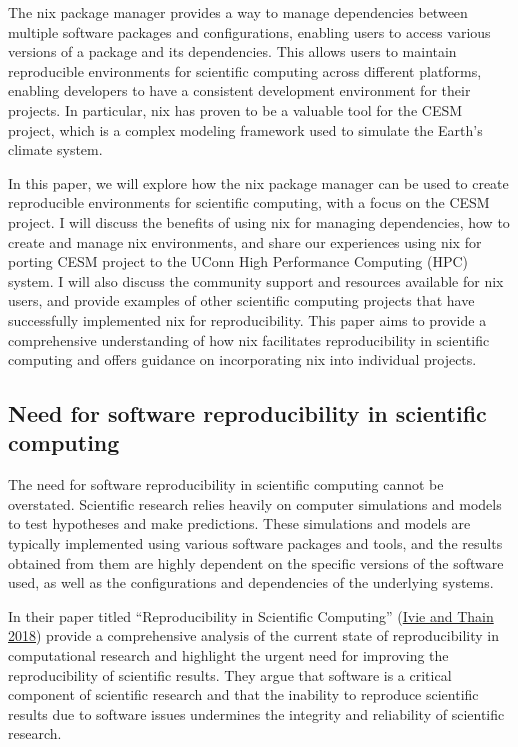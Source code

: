 \documentclass[
]{article}
\begin{document}
The nix package manager provides a way to manage dependencies between multiple software packages and configurations, enabling users to access various versions of a package and its dependencies. This allows users to maintain reproducible environments for scientific computing across different platforms, enabling developers to have a consistent development environment for their projects. In particular, nix has proven to be a valuable tool for the CESM project, which is a complex modeling framework used to simulate the Earth's climate system.

In this paper, we will explore how the nix package manager can be used to create reproducible environments for scientific computing, with a focus on the CESM project. I will discuss the benefits of using nix for managing dependencies, how to create and manage nix environments, and share our experiences using nix for porting CESM project to the UConn High Performance Computing (HPC) system. I will also discuss the community support and resources available for nix users, and provide examples of other scientific computing projects that have successfully implemented nix for reproducibility. This paper aims to provide a comprehensive understanding of how nix facilitates reproducibility in scientific computing and offers guidance on incorporating nix into individual projects.

\hypertarget{need-for-software-reproducibility-in-scientific-computing}{%
\subsection{Need for software reproducibility in scientific computing}\label{need-for-software-reproducibility-in-scientific-computing}}

The need for software reproducibility in scientific computing cannot be overstated. Scientific research relies heavily on computer simulations and models to test hypotheses and make predictions. These simulations and models are typically implemented using various software packages and tools, and the results obtained from them are highly dependent on the specific versions of the software used, as well as the configurations and dependencies of the underlying systems.

In their paper titled ``Reproducibility in Scientific Computing'' (\protect\hyperlink{ref-reproduce0}{Ivie and Thain 2018}) provide a comprehensive analysis of the current state of reproducibility in computational research and highlight the urgent need for improving the reproducibility of scientific results. They argue that software is a critical component of scientific research and that the inability to reproduce scientific results due to software issues undermines the integrity and reliability of scientific research.
\end{document}
